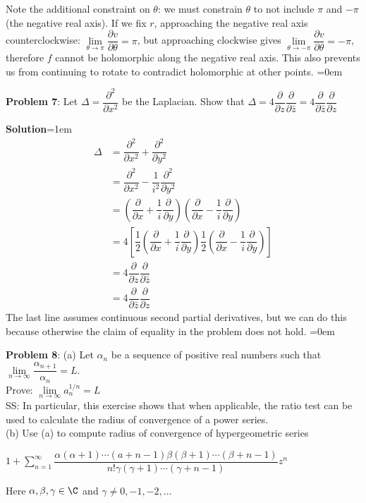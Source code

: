 \documentclass{article}
\begin{document}
Note the additional constraint on $\theta$: we must constrain $\theta$ to not include $\pi$ and $-\pi$ (the negative real axis). If we fix $r$, approaching the negative real axis counterclockwise: $\lim\limits_{\theta \to \pi} \dfrac{\partial v}{\partial \theta} = \pi$, but approaching clockwise gives $\lim\limits_{\theta\to -\pi}\dfrac{\partial v}{\partial \theta} = -\pi$, therefore $f$ cannot be holomorphic along the negative real axis. This also prevents us from continuing to rotate to contradict holomorphic at other points.
\newpage\parskip=0em
\begin{mdframed}[backgroundcolor=blue!20]
\textbf{Problem 7}: Let $\Delta = \dfrac{\partial^2}{\partial x^2} $ be the Laplacian. Show that $\Delta = 4\dfrac{\partial}{\partial z}\dfrac{\partial}{\partial \bar{z}} = 4 \dfrac{\partial}{\partial \bar{z}}\dfrac{\partial}{\partial z}$
\end{mdframed}
\textbf{Solution}\parskip=1em\\
\begin{align*}
    \Delta &= \dfrac{\partial^2}{\partial x^2}+ \dfrac{\partial^2}{\partial y^2}\\
    &= \dfrac{\partial^2}{\partial x^2}- \dfrac{1}{i^2}\dfrac{\partial^2}{\partial y^2}\\
    &= (\dfrac{\partial}{\partial x}+ \dfrac{1}{i}\dfrac{\partial}{\partial y})(\dfrac{\partial}{\partial x}- \dfrac{1}{i}\dfrac{\partial}{\partial y})\\
    &= 4\left[\dfrac{1}{2}(\dfrac{\partial}{\partial x}+ \dfrac{1}{i}\dfrac{\partial}{\partial y})\dfrac{1}{2}(\dfrac{\partial}{\partial x}- \dfrac{1}{i}\dfrac{\partial}{\partial y})\right]\\
    &= 4\dfrac{\partial}{\partial z}\dfrac{\partial}{\partial \bar{z}}\\
    &= 4\dfrac{\partial}{\partial \bar{z}}\dfrac{\partial}{\partial z}
\end{align*}
The last line assumes continuous second partial derivatives, but we can do this because otherwise the claim of equality in the problem does not hold.
\newpage\parskip=0em
\begin{mdframed}[backgroundcolor=blue!20]
\textbf{Problem 8}: (a) Let $\alpha_n$ be a sequence of positive real numbers such that $\lim\limits_{n\to \infty} \dfrac{\alpha_{n+1}}{\alpha_n} = L.$\\ Prove: $\lim\limits_{n \to \infty} a_n^{1/n} = L$\\
SS: In particular, this exercise shows that when applicable, the ratio test can be used to calculate the radius of convergence of a power series.\\
(b) Use (a) to compute radius of convergence of hypergeometric series 
\begin{center}
    $1 + \sum\limits_{n = 1}^\infty \dfrac{\alpha(\alpha + 1)\cdots(a + n-1)\beta(\beta + 1)\cdots(\beta + n-1)}{n!\gamma(\gamma + 1)\cdots(\gamma + n - 1)}z^n$
\end{center}
Here $\alpha, \beta, \gamma \in \C$ and $\gamma \neq 0, -1, -2, \ldots$
\end{mdframed}
\end{document}
